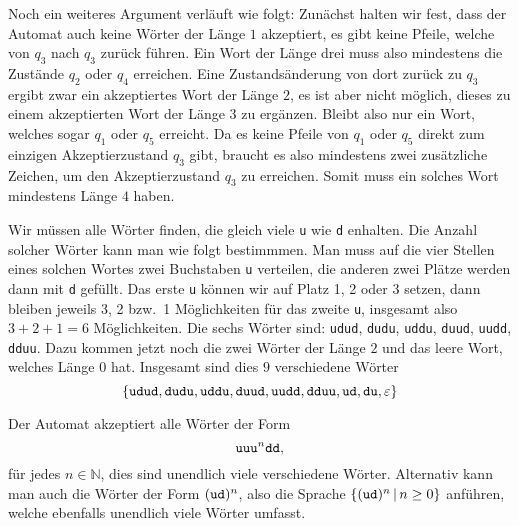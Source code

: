 \begin{loesung}
\begin{teilaufgaben}
Noch ein weiteres Argument verläuft wie folgt:
Zunächst halten wir fest, dass der Automat auch keine Wörter der
Länge $1$ akzeptiert, es gibt keine Pfeile, welche von $q_3$ nach
$q_3$ zurück führen. Ein Wort der Länge drei muss also mindestens
die Zustände $q_2$ oder $q_4$ erreichen. Eine Zustandsänderung von
dort zurück zu $q_3$ ergibt zwar ein akzeptiertes Wort der Länge
$2$, es ist aber nicht möglich, dieses zu einem akzeptierten Wort
der Länge $3$ zu ergänzen.
Bleibt also nur ein Wort, welches
sogar $q_1$ oder $q_5$ erreicht. Da es keine Pfeile von $q_1$
oder $q_5$ direkt zum einzigen Akzeptierzustand $q_3$ gibt,
braucht es also mindestens zwei zusätzliche Zeichen, um den
Akzeptierzustand $q_3$ zu erreichen. Somit muss ein solches
Wort mindestens Länge $4$ haben.
\item Wir müssen alle Wörter finden, die gleich viele {\tt u} wie {\tt d}
enhalten. Die Anzahl solcher Wörter kann man wie folgt bestimmmen.
Man muss auf die vier Stellen eines solchen Wortes zwei Buchstaben
{\tt u} verteilen, die anderen zwei Plätze werden dann mit {\tt d}
gefüllt. Das erste {\tt u} können wir auf Platz 1, 2 oder 3 setzen,
dann bleiben jeweils 3, 2 bzw.~1 Möglichkeiten für das zweite {\tt u},
insgesamt also $3+2+1=6$ Möglichkeiten. Die sechs Wörter sind:
{\tt udud}, {\tt dudu}, {\tt uddu}, {\tt duud}, {\tt uudd}, {\tt dduu}.
Dazu kommen jetzt noch die zwei Wörter der Länge $2$ und das leere Wort,
welches Länge $0$ hat. Insgesamt sind dies $9$ verschiedene Wörter
\[
\{
{\tt udud}, {\tt dudu}, {\tt uddu}, {\tt duud}, {\tt uudd}, {\tt dduu},
{\tt ud},{\tt du}, \varepsilon
\}
\]
\item Der Automat akzeptiert alle Wörter der Form
\[
\text{\tt uu}
\text{\tt u}^n
\text{\tt dd},
\]
für jedes $n\in \mathbb N$,
dies sind unendlich viele verschiedene Wörter. Alternativ kann
man auch die Wörter der Form $({\tt ud})^n$, also die Sprache
$\{({\tt ud})^n\,|\,n\ge 0\}$ anführen,
welche ebenfalls unendlich viele Wörter umfasst.
\qedhere
\end{teilaufgaben}
\end{loesung}


